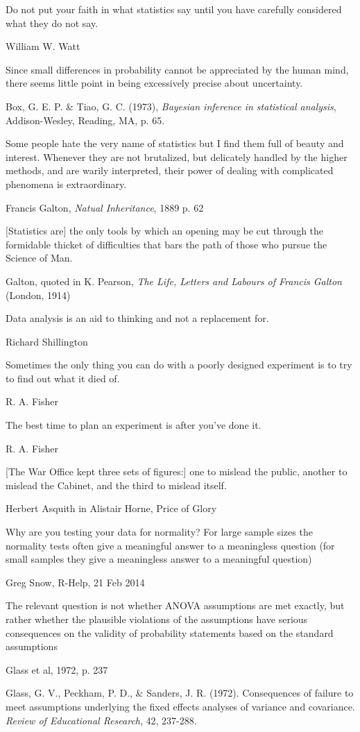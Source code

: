 \epigraph{Do not put your faith in what statistics say until you have carefully considered what they do not say.}{William W. Watt}
	
\epigraph{Since small differences in probability cannot be appreciated by the human mind, there seems little point in being excessively precise about uncertainty.}{Box, G. E. P. \& Tiao, G. C. (1973), \emph{Bayesian inference in statistical analysis}, Addison-Wesley, Reading, MA, p. 65.}

\epigraph{Some people hate the very name of statistics but I find them full of beauty and interest.  Whenever they are not brutalized, but delicately handled by the higher methods, and are warily interpreted,  their power of dealing with complicated phenomena is extraordinary.}{Francis Galton, \emph{Natual Inheritance}, 1889 p. 62}

\epigraph{[Statistics are] the only tools by which an opening may be cut through the formidable thicket of difficulties that bars the path of those who pursue the Science of Man.}{Galton, quoted in K. Pearson, \emph{The Life, Letters and Labours of Francis Galton} (London, 1914)}

\epigraph{Data analysis is an aid to thinking and not a replacement for.}{Richard Shillington}

\epigraph{Sometimes the only thing you can do with a poorly designed experiment is to try to find out what it died of.}{R. A. Fisher}

\epigraph{The best time to plan an experiment is after you've done it.}{R. A. Fisher}

\epigraph{[The War Office kept three sets of figures:] one to mislead the public, another to mislead the Cabinet, and the third to mislead itself.}{Herbert Asquith in Alistair Horne, Price of Glory}

\epigraph{Why are you testing your data for normality?  For large sample sizes the normality tests often give a meaningful answer to a meaningless question (for small samples they give a meaningless answer to a meaningful question)}{Greg Snow, R-Help, 21 Feb 2014}

\epigraph{The relevant question is not whether ANOVA assumptions are met exactly, but rather whether the plausible violations of the assumptions have serious consequences on the validity of probability statements based on the standard assumptions}{Glass et al, 1972, p. 237}
Glass, G. V., Peckham, P. D., \& Sanders, J. R. (1972). Consequences  of failure to meet 
assumptions underlying the fixed effects analyses of variance and covariance.
\emph{Review of Educational Research},  42, 237-288.  


